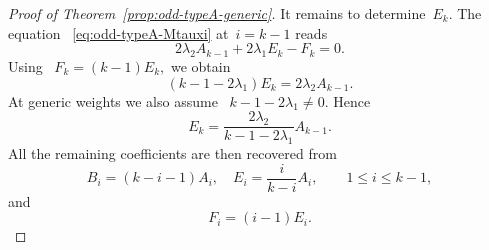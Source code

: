 \documentclass[12pt,a4paper]{amsart}
\theoremstyle{thm}
\theoremstyle{definition}
\begin{document}
\begin{proof}[Proof of Theorem~\textup{\ref{prop:odd-typeA-generic}}]
It remains to determine~\(E_k\). The equation~%
\eqref{eq:odd-typeA-Mtauxi} at~\(i=k-1\) reads
\[
2\lambda_2A_{k-1}
+
2\lambda_1E_k
-
F_k
=
0.
\]
Using~%
$
F_k=(k-1)E_k,
$ we obtain
\begin{equation*}
(k-1-2\lambda_1)E_k
=
2\lambda_2A_{k-1}.
\end{equation*}
At generic weights we also assume~%
$
k-1-2\lambda_1\neq0.
$ Hence
\begin{equation*}
E_k
=
\frac{2\lambda_2}
{k-1-2\lambda_1}
A_{k-1}.
\end{equation*}
All the remaining coefficients are then recovered from
\[
B_i=(k-i-1)A_i,
\quad
E_i=\frac{i}{k-i}A_i,
\qquad
1\leq i\leq k-1,
\]
and
\[
F_i=(i-1)E_i.
\]
\end{proof}
\end{document}
